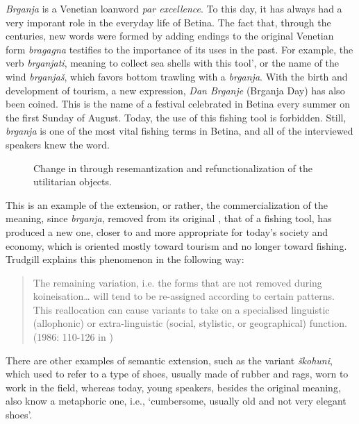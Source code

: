 \documentclass[output=paper]{LSP/langsci}
\begin{document}
\textit{Brganja} is a Venetian loanword \textit{par excellence}. To this day, it has always had a very imporant role in the everyday life of Betina. The fact that, through the centuries, new words were formed by adding  endings to the original Venetian form \textit{bragagna} testifies to the importance of its uses in the past. For example, the verb \textit{brganjati}, meaning to collect sea shells with this tool', or the name of the wind \textit{brganjaš}, which favors bottom trawling with a \textit{brganja}. With the birth and development of tourism, a new expression, \textit{Dan Brganje} (Brganja Day) has also been coined. This is the name of a festival celebrated in Betina every summer on the first Sunday of August. Today, the use of this fishing tool is forbidden. Still, \textit{brganja} is one of the most vital fishing terms in Betina, and all of the interviewed speakers knew the word. 

\begin{figure}[p]


\caption{Change in  through resemantization and refunctionalization of the utilitarian objects.}
\label{fig:skevin:4}
\end{figure}


This is an example of the extension, or rather, the commercialization of the meaning, since \textit{brganja}, removed from its original , that of a fishing tool, has produced a new one, closer to and more appropriate for today’s society and economy, which is oriented mostly toward tourism and no longer toward fishing. Trudgill  explains this phenomenon in the following way: 

\begin{quote}
The remaining variation, i.e. the forms that are not removed during koineisation… will tend to be re-assigned according to certain patterns. This reallocation can cause variants to take on a specialised linguistic (allophonic) or extra-linguistic (social, stylistic, or geographical) function. (1986: 110-126 in \citealt[46]{auer_study_2004})
\end{quote}

There are other examples of semantic extension, such as the variant \textit{škohuni}, which used to refer to a type of shoes, usually made of rubber and rags, worn to work in the field, whereas today, young speakers, besides the original meaning, also know a metaphoric one, i.e., `cumbersome, usually old and not very elegant shoes'.
\end{document}
